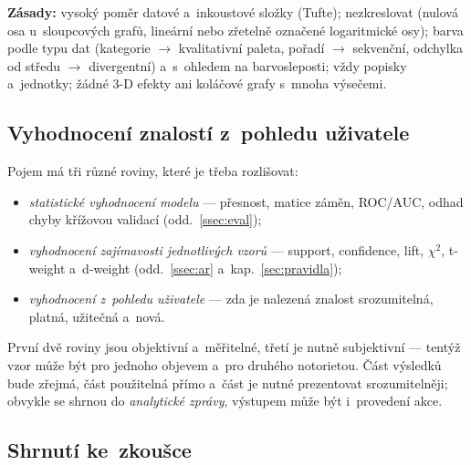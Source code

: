 \documentclass[11pt,a4paper]{article}
\theoremstyle{definition}
\begin{document}
\textbf{Zásady:} vysoký poměr datové a~inkoustové složky (Tufte); nezkreslovat (nulová osa
u~sloupcových grafů, lineární nebo zřetelně označené logaritmické osy); barva podle typu dat
(kategorie $\to$ kvalitativní paleta, pořadí $\to$ sekvenční, odchylka od středu $\to$
divergentní) a~s~ohledem na barvosleposti; vždy popisky a~jednotky; žádné 3-D efekty ani
koláčové grafy s~mnoha výsečemi.

\subsection{Vyhodnocení znalostí z~pohledu uživatele}

Pojem  má tři různé roviny, které je třeba rozlišovat:
\begin{itemize}
\item \emph{statistické vyhodnocení modelu} --- přesnost, matice záměn, ROC/AUC, odhad chyby
      křížovou validací (odd.~\ref{ssec:eval});
\item \emph{vyhodnocení zajímavosti jednotlivých vzorů} --- support, confidence, lift,
      $\chi^2$, t-weight a~d-weight (odd.~\ref{ssec:ar} a~kap.~\ref{sec:pravidla});
\item \emph{vyhodnocení z~pohledu uživatele} --- zda je nalezená znalost srozumitelná,
      platná, užitečná a~nová.
\end{itemize}
První dvě roviny jsou objektivní a~měřitelné, třetí je nutně subjektivní --- tentýž vzor může
být pro jednoho objevem a~pro druhého notorietou. Část výsledků bude zřejmá, část použitelná
přímo a~část je nutné prezentovat srozumitelněji; obvykle se shrnou do \emph{analytické
zprávy}, výstupem může být i~provedení akce.

\subsection{Shrnutí ke~zkoušce}
\end{document}
